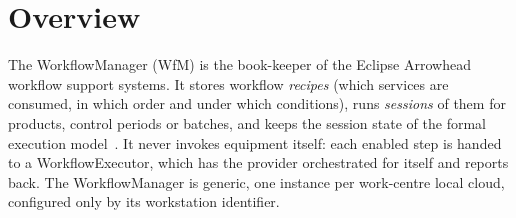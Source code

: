 \documentclass[a4paper]{arrowhead}
\begin{document}

\ArrowheadSetup

\begin{center}
  \vspace*{1cm}
  \huge{\arrowtitle}

  \vspace*{0.2cm}
  \LARGE{\arrowtype}
  \vspace*{1cm}

  
  \vspace*{\fill}

  

  \vspace*{1cm}
  \vspace*{\fill}

  \begin{abstract}
    This document describes the WorkflowManager, an Eclipse Arrowhead support system that keeps the books of workflows: it holds recipes and sessions, validates recipes, advances sessions with the transition rules of the formal model, dispatches steps to WorkflowExecutors and reports to the product. Documentation edition 5.4.0; system version 5.4.0 (framework), service versions 1.0.0.
  \end{abstract}

  \vspace*{1cm}
\end{center}

\newpage

\tableofcontents
\newpage

\section{Overview}
\label{sec:overview}
The WorkflowManager (WfM) is the book-keeper of the Eclipse Arrowhead workflow support systems. It
stores workflow \emph{recipes} (which services are consumed, in which order and under which conditions), runs
\emph{sessions} of them for products, control periods or batches, and keeps the session state of the formal execution
model~\cite{varga2026}. It never invokes equipment itself: each enabled step is handed to a WorkflowExecutor, which has
the provider orchestrated for itself and reports back. The WorkflowManager is generic, one instance per work-centre
local cloud, configured only by its workstation identifier.
\end{document}
